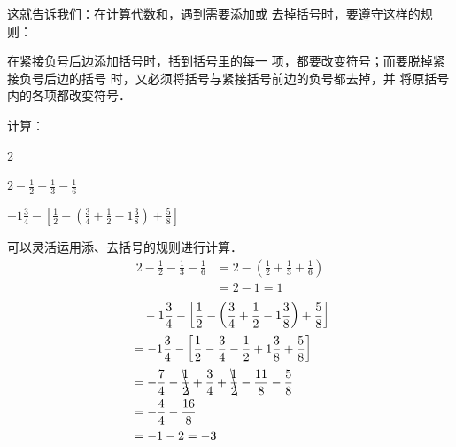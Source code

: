这就告诉我们：在计算代数和，遇到需要添加或
去掉括号时，要遵守这样的规则：

\begin{blk}{}
   在紧接负号后边添加括号时，括到括号里的每一
项，都要改变符号；而要脱掉紧接负号后边的括号
时，又必须将括号与紧接括号前边的负号都去掉，并
将原括号内的各项都改变符号．
\end{blk}
   


\begin{example}
    计算：
\begin{enumerate}
    \begin{multicols}{2}
           \item $2-\frac{1}{2}-\frac{1}{3}-\frac{1}{6}$
           \item $-1\frac{3}{4}-\left[\frac{1}{2}-\left(\frac{3}{4}+\frac{1}{2}-1\frac{3}{8}\right)+\frac{5}{8}\right]$
    \end{multicols}
 
\end{enumerate}
\end{example}

\begin{solution}
    可以灵活运用添、去括号的规则进行计算．
\[ \begin{split}
    2-\frac{1}{2}-\frac{1}{3}-\frac{1}{6}&=2-\left(\frac{1}{2}+\frac{1}{3}+\frac{1}{6}\right)\\
    &=2-1=1
\end{split}  \]
\[ \begin{split}
    &\quad -1\frac{3}{4}-\left[\frac{1}{2}-\left(\frac{3}{4}+\frac{1}{2}-1\frac{3}{8}\right)+\frac{5}{8}\right]\\
    &=-1\frac{3}{4}-\left[\frac{1}{2}-\frac{3}{4}-\frac{1}{2}+1\frac{3}{8}+\frac{5}{8}\right]\\
    &=-\frac{7}{4}-\bcancel{\frac{1}{2}}+\frac{3}{4}+\bcancel{\frac{1}{2}}-\frac{11}{8}-\frac{5}{8}\\
    &=-\frac{4}{4}-\frac{16}{8}\\
    &=-1-2=-3
\end{split}  \]
\end{solution}

